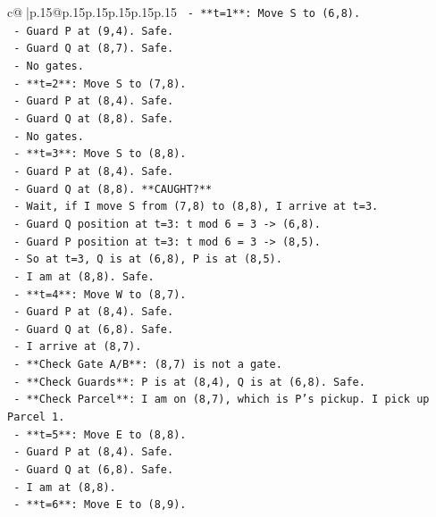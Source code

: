 \documentclass{article}
\begin{document}
{\begin{supertabular}{c@{$\;$}|p{.15\linewidth}@{}p{.15\linewidth}p{.15\linewidth}p{.15\linewidth}p{.15\linewidth}p{.15\linewidth}}
{{{\texttt{    {-}   **t=1**: Move S to (6,8).} \\
\texttt{        {-}   Guard P at (9,4). Safe.} \\
\texttt{        {-}   Guard Q at (8,7). Safe.} \\
\texttt{        {-}   No gates.} \\
\texttt{    {-}   **t=2**: Move S to (7,8).} \\
\texttt{        {-}   Guard P at (8,4). Safe.} \\
\texttt{        {-}   Guard Q at (8,8). Safe.} \\
\texttt{        {-}   No gates.} \\
\texttt{    {-}   **t=3**: Move S to (8,8).} \\
\texttt{        {-}   Guard P at (8,4). Safe.} \\
\texttt{        {-}   Guard Q at (8,8). **CAUGHT?**} \\
\texttt{        {-}   Wait, if I move S from (7,8) to (8,8), I arrive at t=3.} \\
\texttt{        {-}   Guard Q position at t=3: t mod 6 = 3 {-}> (6,8).} \\
\texttt{        {-}   Guard P position at t=3: t mod 6 = 3 {-}> (8,5).} \\
\texttt{        {-}   So at t=3, Q is at (6,8), P is at (8,5).} \\
\texttt{        {-}   I am at (8,8). Safe.} \\
\texttt{    {-}   **t=4**: Move W to (8,7).} \\
\texttt{        {-}   Guard P at (8,4). Safe.} \\
\texttt{        {-}   Guard Q at (6,8). Safe.} \\
\texttt{        {-}   I arrive at (8,7).} \\
\texttt{        {-}   **Check Gate A/B**: (8,7) is not a gate.} \\
\texttt{        {-}   **Check Guards**: P is at (8,4), Q is at (6,8). Safe.} \\
\texttt{        {-}   **Check Parcel**: I am on (8,7), which is P's pickup. I pick up Parcel 1.} \\
\texttt{    {-}   **t=5**: Move E to (8,8).} \\
\texttt{        {-}   Guard P at (8,4). Safe.} \\
\texttt{        {-}   Guard Q at (6,8). Safe.} \\
\texttt{        {-}   I am at (8,8).} \\
\texttt{    {-}   **t=6**: Move E to (8,9).} \\
}}}
\end{supertabular}}
\end{document}
